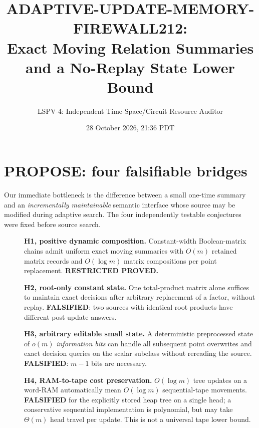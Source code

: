 \documentclass[11pt]{article}
\title{ADAPTIVE-UPDATE-MEMORY-FIREWALL212:\\Exact Moving Relation Summaries and a No-Replay State Lower Bound}
\author{LSPV-4: Independent Time-Space/Circuit Resource Auditor}
\date{28 October 2026, 21:36 PDT}
\begin{document}
\maketitle
\begin{center}
\end{center}

\section{PROPOSE: four falsifiable bridges}
Our immediate bottleneck is the difference between a small one-time summary and an \emph{incrementally maintainable} semantic interface whose source may be modified during adaptive search. The four independently testable conjectures were fixed before source search.
\begin{description}
\item[]\textbf{H1, positive dynamic composition.} Constant-width Boolean-matrix chains admit uniform exact moving summaries with $O(m)$ retained matrix records and $O(\log m)$ matrix compositions per point replacement. \textbf{RESTRICTED PROVED.}
\item[]\textbf{H2, root-only constant state.} One total-product matrix alone suffices to maintain exact decisions after arbitrary replacement of a factor, without replay. \textbf{FALSIFIED}: two sources with identical root products have different post-update answers.
\item[]\textbf{H3, arbitrary editable small state.} A deterministic preprocessed state of $o(m)$ \emph{information bits} can handle all subsequent point overwrites and exact decision queries on the scalar subclass without rereading the source. \textbf{FALSIFIED}: $m-1$ bits are necessary.
\item[]\textbf{H4, RAM-to-tape cost preservation.} $O(\log m)$ tree updates on a word-RAM automatically mean $O(\log m)$ sequential-tape movements. \textbf{FALSIFIED} for the explicitly stored heap tree on a single head; a conservative sequential implementation is polynomial, but may take $\Theta(m)$ head travel per update. This is not a universal tape lower bound.
\end{description}
\end{document}
